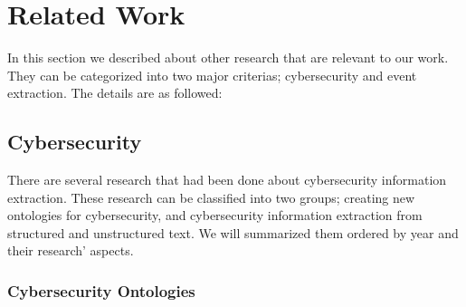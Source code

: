 \chapter{Related Work}
\thispagestyle{plain}

\label{Chapter2}

In this section we described about other research that are relevant to our work. They can be categorized into two major criterias; cybersecurity and event extraction. The details are as followed:


\section{Cybersecurity}
\label{CyberResearch}

	There are several research that had been done about cybersecurity information extraction. These research can be classified into two groups; creating new ontologies for cybersecurity, and cybersecurity information extraction from structured and unstructured text. We will summarized them ordered by year and their research’ aspects. 

\subsection{Cybersecurity Ontologies}

